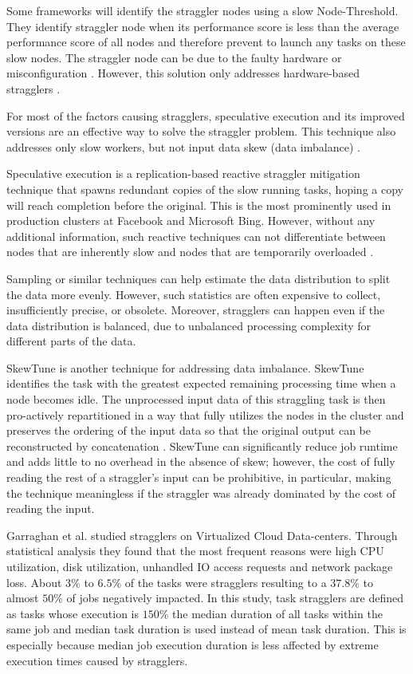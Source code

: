 Some frameworks will identify the straggler nodes using a slow Node-Threshold. 
They identify straggler node when its performance score is less than the average performance score of all nodes and therefore prevent to launch any tasks on these slow nodes. 
The straggler node can be due to the faulty hardware or misconfiguration \cite{Dean2004}. 
However, this solution only addresses hardware-based stragglers \cite{Chen2014}.

For most of the factors causing stragglers, speculative execution and its improved versions are an effective way to solve the straggler problem. 
This technique also addresses only slow workers, but not input data skew (data imbalance) \cite{Chen2014}.

Speculative execution is a replication-based reactive straggler mitigation technique that spawns redundant copies of the slow running tasks, hoping a copy will reach completion before the original. 
This is the most prominently used in production clusters at Facebook and Microsoft Bing. 
However, without any additional information, such reactive techniques can not differentiate between nodes that are inherently slow and nodes that are temporarily overloaded \cite{Bhandare2016}.

Sampling or similar techniques can help estimate the data distribution to split the data more evenly. 
However, such statistics are often expensive to collect, insufficiently precise, or obsolete. 
Moreover, stragglers can happen even if the data distribution is balanced, due to unbalanced processing complexity for different parts of the data.

SkewTune is another technique for addressing data imbalance. 
SkewTune identifies the task with the greatest expected remaining processing time when a node becomes idle. 
The unprocessed input data of this straggling task is then pro-actively repartitioned in a way that fully utilizes the nodes in the cluster and preserves 
the ordering of the input data so that the original output can be reconstructed by concatenation \cite{Kwon2012}. 
SkewTune can significantly reduce job runtime and adds little to no overhead in the absence of skew; however, the cost of fully reading the rest of a straggler's input can be prohibitive, in particular, making 
the technique meaningless if the straggler was already dominated by the cost of reading the input.

Garraghan et al. \cite{Garraghan2016} studied stragglers on Virtualized Cloud Data-centers. 
Through statistical analysis they found that the most frequent reasons were high CPU utilization, disk utilization, unhandled IO access requests and network package loss. 
About $3\%$ to $6.5\%$ of the tasks were stragglers resulting to a $37.8\%$ to almost $50\%$ of jobs negatively impacted. 
In this study, task stragglers are defined as tasks whose execution is $150\%$ the median duration of all tasks within the same job and median task duration is used instead of mean task duration. 
This is especially because median job execution duration is less affected by extreme execution times caused by stragglers. 

